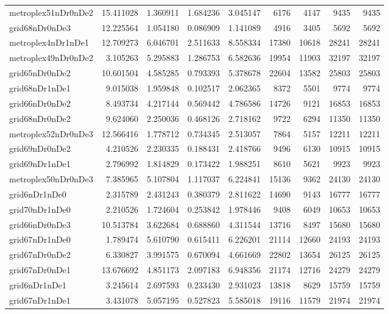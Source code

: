 \begin{longtable}{|l|r|r|r|r|r|r|r|r|}
metroplex51nDr0nDe2 & 15.411028 & 1.360911 & 1.684236 & 3.045147 & 6176 & 4147 & 9435 & 9435 \\
grid68nDr0nDe3 & 12.225564 & 1.054180 & 0.086909 & 1.141089 & 4916 & 3405 & 5692 & 5692 \\
metroplex4nDr1nDe1 & 12.709273 & 6.046701 & 2.511633 & 8.558334 & 17380 & 10618 & 28241 & 28241 \\
metroplex49nDr0nDe2 & 3.105263 & 5.295883 & 1.286753 & 6.582636 & 19954 & 11903 & 32197 & 32197 \\
grid65nDr0nDe2 & 10.601504 & 4.585285 & 0.793393 & 5.378678 & 22604 & 13582 & 25803 & 25803 \\
grid68nDr1nDe1 & 9.015038 & 1.959848 & 0.102517 & 2.062365 & 8372 & 5501 & 9774 & 9774 \\
grid66nDr0nDe2 & 8.493734 & 4.217144 & 0.569442 & 4.786586 & 14726 & 9121 & 16853 & 16853 \\
grid68nDr0nDe2 & 9.624060 & 2.250036 & 0.468126 & 2.718162 & 9722 & 6294 & 11350 & 11350 \\
metroplex52nDr0nDe3 & 12.566416 & 1.778712 & 0.734345 & 2.513057 & 7864 & 5157 & 12211 & 12211 \\
grid69nDr0nDe2 & 4.210526 & 2.230335 & 0.188431 & 2.418766 & 9496 & 6130 & 10915 & 10915 \\
grid69nDr1nDe1 & 2.796992 & 1.814829 & 0.173422 & 1.988251 & 8610 & 5621 & 9923 & 9923 \\
metroplex50nDr0nDe3 & 7.385965 & 5.107804 & 1.117037 & 6.224841 & 15136 & 9362 & 24130 & 24130 \\
grid6nDr1nDe0 & 2.315789 & 2.431243 & 0.380379 & 2.811622 & 14690 & 9143 & 16777 & 16777 \\
grid70nDr1nDe0 & 2.210526 & 1.724604 & 0.253842 & 1.978446 & 9408 & 6049 & 10653 & 10653 \\
grid66nDr0nDe3 & 10.513784 & 3.622684 & 0.688860 & 4.311544 & 13716 & 8497 & 15680 & 15680 \\
grid67nDr1nDe0 & 1.789474 & 5.610790 & 0.615411 & 6.226201 & 21114 & 12660 & 24193 & 24193 \\
grid67nDr0nDe2 & 6.330827 & 3.991575 & 0.670094 & 4.661669 & 22802 & 13654 & 26125 & 26125 \\
grid67nDr0nDe1 & 13.676692 & 4.851173 & 2.097183 & 6.948356 & 21174 & 12716 & 24279 & 24279 \\
grid6nDr1nDe1 & 3.245614 & 2.697593 & 0.233430 & 2.931023 & 13818 & 8629 & 15759 & 15759 \\
grid67nDr1nDe1 & 3.431078 & 5.057195 & 0.527823 & 5.585018 & 19116 & 11579 & 21974 & 21974 \\

\end{longtable}
